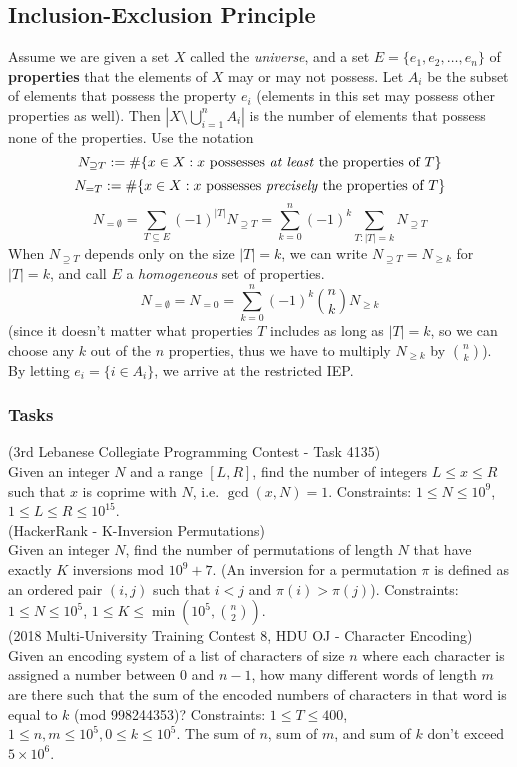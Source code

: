 \documentclass[12pt]{extarticle}
\begin{document}
\subsection*{Inclusion-Exclusion Principle}
Assume we are given a set $X$ called the \emph{universe}, and a set $E=\{e_{1},e_{2},\dots,e_{n}\}$ of \textbf{properties} that the elements of $X$ may or may not possess. Let $A_{i}$ be the subset of elements that possess the property $e_{i}$ (elements in this set may possess other properties as well). Then $| X\setminus \bigcup_{i=1}^{n}A_{i} |$ is the number of elements that possess none of the properties. Use the notation $$N_{\supseteq T}:=\text{\#}\{x\in X:x \text{ possesses \emph{at least} the properties of }T\}$$
$$N_{= T}:=\text{\#}\{x\in X:x \text{ possesses \emph{precisely} the properties of }T\}$$
$$N_{=\emptyset}=\sum_{T\subseteq E}(-1)^{|T|}N_{\supseteq T}=\sum_{k=0}^{n}(-1)^{k}\sum_{T:|T|=k}N_{\supseteq T}$$
When $N_{\supseteq T}$ depends only on the size $|T|=k$, we can write $N_{\supseteq T}=N_{\geq k}$ for $|T|=k$, and call $E$ a \emph{homogeneous} set of properties. 
$$N_{=\emptyset}=N_{=0}=\sum_{k=0}^{n}(-1)^{k}{n\choose k} N_{\geq k}$$
(since it doesn't matter what properties $T$ includes as long as $|T|=k$, so we can choose any $k$ out of the $n$ properties, thus we have to multiply $N_{\geq k}$ by $n\choose k$).
By letting $e_{i}=\{i\in A_{i}\}$, we arrive at the restricted IEP.
\subsubsection*{Tasks} 
(3rd Lebanese Collegiate Programming Contest - Task 4135) \\ 
Given an integer $N$ and a range $[L, R]$, find the number of integers $L\leq x\leq R$ such that $x$ is coprime with $N$, i.e. $\gcd(x, N) = 1$. Constraints: $1\leq N \leq 10^{9}$, $1\leq L\leq R\leq 10^{15}$.\\

\noindent (HackerRank - K-Inversion Permutations)\\
Given an integer $N$, find the number of permutations of length $N$ that have exactly $K$ inversions mod $10^{9}+7$. (An inversion for a permutation $\pi$ is defined as an ordered pair $(i, j)$ such that $i<j$ and $\pi(i)>\pi(j)$). Constraints: $1\leq N\leq 10^{5}$, $1\leq K\leq \min(10^{5},{n\choose 2})$.\\

\noindent (2018 Multi-University Training Contest 8, HDU OJ - Character Encoding)\\
Given an encoding system of a list of characters of size $n$ where each character is assigned a number between 0 and $n-1$, how many different words of length $m$ are there such that the sum of the encoded numbers of characters in that word is equal to $k$ (mod 998244353)? Constraints: $1\leq T\leq 400$, $1\leq n,m\leq 10^{5}, 0\leq k\leq 10^{5}$. The sum of $n$, sum of $m$, and sum of $k$ don't exceed $5\times 10^{6}$.
\end{document}
